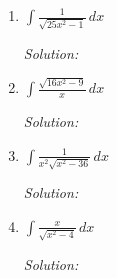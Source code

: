 \documentclass[16pt]{article}
\theoremstyle{remark}
\begin{document}
\begin{enumerate}
\item $\displaystyle{\int \frac{1}{\sqrt{25x^2-1}}\, dx}$
\begin{mdframed}[style=TheoremFrame]
\textit{Solution:}

\end{mdframed}
\item $\displaystyle{\int \frac{\sqrt{16x^2-9}}{x}\, dx}$
\begin{mdframed}[style=TheoremFrame]
\textit{Solution:}

\end{mdframed}
\newpage
\item $\displaystyle{\int \frac{1}{x^2\sqrt{x^2-36}}\, dx}$
\begin{mdframed}[style=TheoremFrame]
\textit{Solution:}

\end{mdframed}

\item $\displaystyle{\int \frac{x}{\sqrt{x^2-4}}\, dx}$
\begin{mdframed}[style=TheoremFrame]
\textit{Solution:}

\end{mdframed}


\end{enumerate}
\end{document}
